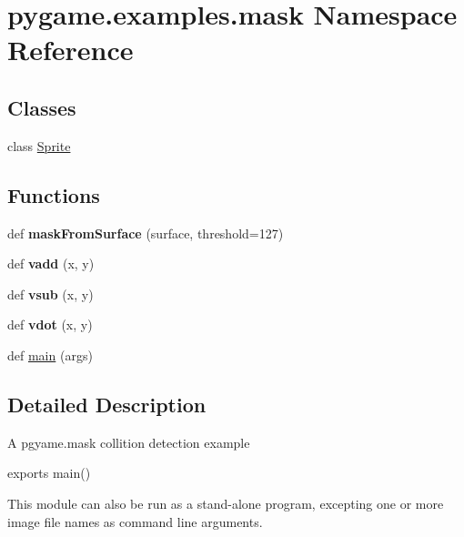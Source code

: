 \hypertarget{namespacepygame_1_1examples_1_1mask}{}\section{pygame.\+examples.\+mask Namespace Reference}
\label{namespacepygame_1_1examples_1_1mask}
\subsection*{Classes}
\begin{DoxyCompactItemize}
\item 
class \hyperlink{classpygame_1_1examples_1_1mask_1_1_sprite}{Sprite}
\end{DoxyCompactItemize}
\subsection*{Functions}
\begin{DoxyCompactItemize}
\item 
\mbox{\label{namespacepygame_1_1examples_1_1mask_abd837bd4e826088d985d9ca106b955e6}} 
def {\bfseries mask\+From\+Surface} (surface, threshold=127)
\item 
\mbox{\label{namespacepygame_1_1examples_1_1mask_a68fcbf131f56c5f3969bacdd89ca540e}} 
def {\bfseries vadd} (x, y)
\item 
\mbox{\label{namespacepygame_1_1examples_1_1mask_a12325ddc7e5a14060270739ea873d621}} 
def {\bfseries vsub} (x, y)
\item 
\mbox{\label{namespacepygame_1_1examples_1_1mask_a2e63a4838d0986acd54322ff59104ef4}} 
def {\bfseries vdot} (x, y)
\item 
def \hyperlink{namespacepygame_1_1examples_1_1mask_a5a1d84d7d63138af459b6da9692a2cf9}{main} (args)
\end{DoxyCompactItemize}


\subsection{Detailed Description}
\begin{DoxyVerb}A pgyame.mask collition detection example

exports main()

This module can also be run as a stand-alone program, excepting
one or more image file names as command line arguments.\end{DoxyVerb}
 

